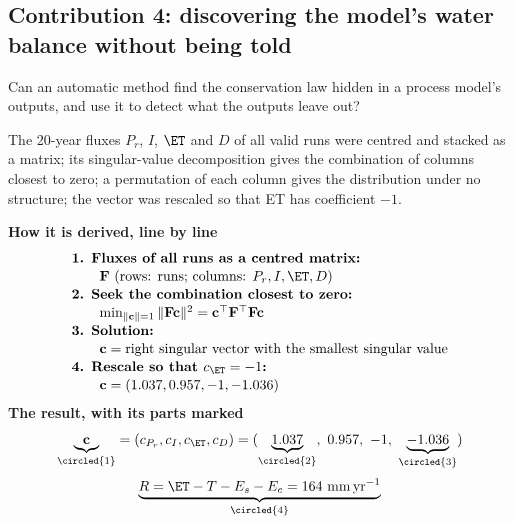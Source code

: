 \begin{pins}
\end{pins}

\subsection{Contribution 4: discovering the model's water balance without being told}
\begin{problem}
Can an automatic method find the conservation law hidden in a process model's outputs, and use it to detect what the outputs leave out?
\end{problem}
\begin{derivation}
The 20-year fluxes $P_r$, $I$, $\ET$ and $D$ of all valid runs were centred and stacked as a matrix; its singular-value decomposition gives the combination of columns closest to zero; a permutation of each column gives the distribution under no structure; the vector was rescaled so that ET has coefficient $-1$.
\end{derivation}
\begin{keyresult}
\begin{pencil}
{\small\noindent\textbf{How it is derived, line by line}
\[\begin{array}{@{}l@{}}\textbf{1. Fluxes of all runs as a centred matrix:}\\[1pt]
\qquad \mathbf F\ (\text{rows: runs; columns: }P_r,I,\ET,D)\\[1pt]
\textbf{2. Seek the combination closest to zero:}\\[1pt]
\qquad \min_{\|\mathbf c\|=1}\|\mathbf F\mathbf c\|^2=\mathbf c^\top\mathbf F^\top\mathbf F\mathbf c\\[1pt]
\textbf{3. Solution:}\\[1pt]
\qquad \mathbf c=\text{right singular vector with the smallest singular value}\\[1pt]
\textbf{4. Rescale so that } c_{\ET}=-1\textbf{:}\\[1pt]
\qquad \mathbf c=(1.037,0.957,-1,-1.036)
\end{array}\]}
\noindent\textbf{The result, with its parts marked}
\[\underbrace{\mathbf c}_{\circled{1}}=(c_{P_r},c_I,c_{\ET},c_D)=(\underbrace{1.037}_{\circled{2}},\ 0.957,\ -1,\ \underbrace{-1.036}_{\circled{3}})\]
\[\underbrace{R=\ET-T-E_s-E_c=164\ \mathrm{mm\,yr^{-1}}}_{\circled{4}}\]
\end{pencil}
\end{keyresult}
